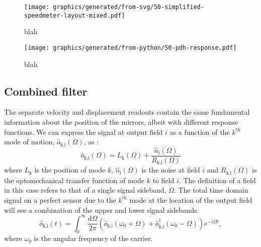 \begin{figure}
  \centering
  \texttt{[image: graphics/generated/from-svg/50-simplified-speedmeter-layout-mixed.pdf]}
  \caption[Simplified layout of the \SSMEXPT{} including both displacement and velocity feedback paths]{\label{fig:simplified-speedmeter-layout-mixed}blah}
\end{figure}

\begin{figure}
  \centering
  \texttt{[image: graphics/generated/from-python/50-pdh-response.pdf]}
  \caption[Frequency response of the differential arm cavity degree of freedom to the Pound-Drever-Hall readout]{\label{fig:pdh-response}blah}
\end{figure}

\subsection{\label{sec:combined-filter}Combined filter}

The separate velocity and displacement readouts contain the same fundamental information about the position of the mirrors, albeit with different response functions. We can express the signal at output field $i$ as a function of the $k^{\textrm{th}}$ mode of motion, $\hat{o}_{\textrm{k,i}} \left( \Omega \right)$, as \cite{Kimble2001}:
\begin{equation}
  \label{eq:readout-signals}
  \hat{o}_{\textrm{k,i}} \left( \Omega \right) = L_{\textrm{k}}\left(\Omega\right) + \frac{\hat{n}_{\textrm{i}} \left( \Omega \right)}{R_{\textrm{k,i}} \left( \Omega \right)}
\end{equation}
where $L_{\textrm{k}}$ is the position of mode $k$, $\hat{n}_{\textrm{i}} \left( \Omega \right)$ is the noise at field $i$ and $R_{\textrm{k,i}} \left( \Omega \right)$ is the optomechanical transfer function of mode $k$ to field $i$. The definition of a field in this case refers to that of a single signal sideband, $\Omega$. The total time domain signal on a perfect sensor due to the $k^{\textrm{th}}$ mode at the location of the output field will see a combination of the upper and lower signal sidebands:
\begin{equation}
  \hat{o}_{\textrm{k,i}} \left( t \right) = \int_{0}^{\infty} \frac{\textrm{d} \Omega}{2 \pi} \left( \hat{o}_{\textrm{k,i}} \left( \omega_{0} + \Omega \right) + \hat{o}_{\textrm{k,i}}^\dag \left( \omega_{0} - \Omega \right) \right) e^{-i \Omega t},
\end{equation}
where $\omega_{0}$ is the angular frequency of the carrier.

